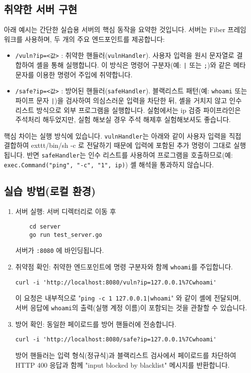 \documentclass{article}
\begin{document}
\subsection{취약한 서버 구현}

아래 예시는 간단한 실습용 서버의 핵심 동작을 요약한 것입니다. 서버는 Fiber 프레임워크를 사용하며, 두 개의 주요 엔드포인트를 제공합니다:

\begin{itemize}
	\item \texttt{/vuln?ip=<값>} : 취약한 핸들러(\texttt{vulnHandler}). 사용자 입력을 원시 문자열로 결합하여 셸을 통해 실행합니다. 이 방식은 명령어 구분자(예: \texttt{|} 또는 \texttt{;})와 같은 메타문자를 이용한 명령어 주입에 취약합니다.
	\item \texttt{/safe?ip=<값>} : 방어된 핸들러(\texttt{safeHandler}). 블랙리스트 패턴(예: \texttt{whoami} 또는 파이프 문자 \texttt{|})을 검사하여 의심스러운 입력을 차단한 뒤, 셸을 거치지 않고 인수 리스트 방식으로 외부 프로그램을 실행합니다. 실험에서는 ip 검증 파이프라인은 주석처리 해두었지만, 실험 해보실 경우 주석 해제후 실험해보셔도 좋습니다.
\end{itemize}

    핵심 차이는 실행 방식에 있습니다. \texttt{vulnHandler}는 아래와 같이 사용자 입력을 직접 결합하여 exttt{/bin/sh -c} 로 전달하기 때문에 입력에 포함된 추가 명령이 그대로 실행됩니다. 반면 \texttt{safeHandler}는 인수 리스트를 사용하여 프로그램을 호출하므로(예: \texttt{exec.Command("ping", "-c", "1", ip)}) 셸 해석을 통과하지 않습니다.

\subsection{실습 방법(로컬 환경)}
\begin{enumerate}
	\item 서버 실행: 서버 디렉터리로 이동 후
	\begin{lstlisting}
	cd server
	go run test_server.go
	\end{lstlisting}
	서버가 \texttt{:8080} 에 바인딩됩니다.
	\item 취약점 확인: 취약한 엔드포인트에 명령 구분자와 함께 \texttt{whoami}를 주입합니다.
	\begin{lstlisting}[caption={취약한 엔드포인트에 대한 테스트 예시}]
	curl -i 'http://localhost:8080/vuln?ip=127.0.0.1%7Cwhoami'
	\end{lstlisting}
	이 요청은 내부적으로 "\texttt{ping -c 1 127.0.0.1|whoami}" 와 같이 셸에 전달되며, 서버 응답에 \texttt{whoami}의 출력(실행 계정 이름)이 포함되는 것을 관찰할 수 있습니다.

	\item 방어 확인: 동일한 페이로드를 방어 핸들러에 전송합니다.
	\begin{lstlisting}[caption={방어 핸들러에 대한 테스트 예시}]
	curl -i 'http://localhost:8080/safe?ip=127.0.0.1%7Cwhoami'
	\end{lstlisting}
	방어 핸들러는 입력 형식(정규식)과 블랙리스트 검사에서 페이로드를 차단하여 HTTP 400 응답과 함께 "input blocked by blacklist" 메시지를 반환합니다.
\end{enumerate}
\end{document}
